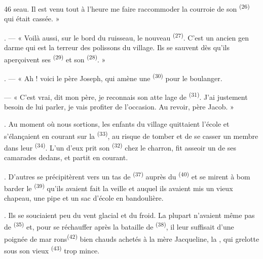 \begin{VUpage}[48]{46}
\VUcontinue
seau. Il est venu tout à l'heure me faire raccommoder\nl
la courroie de son \textsuperscript{(26)} qui était cassée. »

. --- « Voilà aussi, sur le bord du ruisseau, le\nl
nouveau \textsuperscript{(27)}. C'est un ancien gen\cc
darme qui est la terreur des polissons du village. Ils\nl
se sauvent dès qu'ils aperçoivent ses \textsuperscript{(29)} et\nl
son \textsuperscript{(28)}. »

. --- « Ah ! voici le père Joseph, qui amène une\nl
{}\textsuperscript{(30)} pour le boulanger.

--- « C'est vrai, dit mon père, je reconnais son atte\cc
lage de \textsuperscript{(31)}. J'ai justement besoin de lui parler,\nl
je vais profiter de l'occasion. Au revoir, père Jacob. »

. Au moment où nous sortions, les enfants du\nl
village quittaient l'école et s'élançaient en courant\nl
sur la \textsuperscript{(33)}, au risque de tomber et de se\nl
casser un membre dans leur \textsuperscript{(34)}. L'un d'eux\nl
prit son \textsuperscript{(32)} chez le charron, fit asseoir un\nl
de ses camarades dedans, et partit en courant.

. D'autres se précipitèrent vers un tas de\nl
{}\textsuperscript{(37)} auprès du \textsuperscript{(40)} et se mirent à bom\cc
barder le \textsuperscript{(39)} qu'ils avaient\nl
fait la veille et auquel ils avaient mis un vieux\nl
chapeau, une pipe et un sac d'école en bandoulière.

. Ils se souciaient peu du vent glacial et du froid.\nl
La plupart n'avaient même pas de \textsuperscript{(35)} et,\nl
pour se réchauffer après la bataille de \nl
{}\textsuperscript{(38)}, il leur suffisait d'une poignée de mar\cc
rons\textsuperscript{(42)} bien chauds achetés à la mère Jacqueline,\nl
la , qui grelotte sous son vieux \textsuperscript{(43)}\nl
trop mince.


\end{VUpage}
